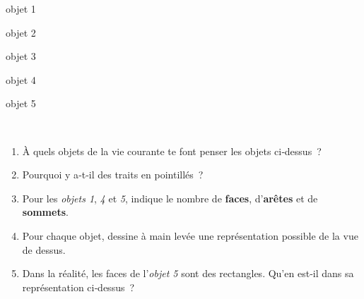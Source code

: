 \begin{activite}
\begin{partie}
\begin{minipage}[c]{0.19\linewidth}
\begin{center} objet 1 \end{center}
 \end{minipage} \hfill%
\begin{minipage}[c]{0.19\linewidth}
 \begin{center} objet 2 \end{center}
 \end{minipage} \hfill%
\begin{minipage}[c]{0.19\linewidth}
\begin{center} objet 3 \end{center}
 \end{minipage} \hfill%
\begin{minipage}[c]{0.19\linewidth}
\begin{center} objet 4 \end{center}
 \end{minipage} \hfill%
\begin{minipage}[c]{0.19\linewidth}
\begin{center} objet 5 \end{center}
 \end{minipage} \\
\begin{enumerate}
 \item À quels objets de la vie courante te font penser les objets ci‑dessus ?
 \item Pourquoi y a‑t‑il des traits en pointillés ?
 \item Pour les \emph{objets 1}, \emph{4} et \emph{5}, indique le nombre de \textbf{faces}, d'\textbf{arêtes} et de \textbf{sommets}.
 \item Pour chaque objet, dessine à main levée une représentation possible de la vue de dessus.
 \item Dans la réalité, les faces de l'\emph{objet 5} sont des rectangles. Qu'en est‑il dans sa représentation ci‑dessus ?
 \end{enumerate}
\end{partie}


\end{activite}

